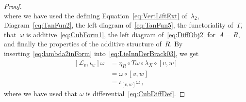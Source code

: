 \documentclass[12pt,reqno, a4paper]{amsart}
\numberwithin{equation}{section}
\theoremstyle{plain}
\theoremstyle{definition}
\theoremstyle{remark}
\newcommand{\Lie}{\mathcal{L}}
\newcommand{\Val}{\eta}
\begin{document}
\begin{proof}
\begin{equation}
\end{equation}
where we have used the defining Equation~\eqref{eq:VertLiftExt} of~$\lambda_2$, Diagram~\eqref{eq:TanFun2}, the left diagram of~\eqref{eq:TanFun5}, the functoriality of~$T$, that~$\omega$ is additive~\eqref{eq:CubForm1}, the left diagram of~\eqref{eq:DiffObj2} for~$A=R$, and finally the properties of the additive structure of~$R$. By inserting~\eqref{eq:lambda2inForm} into~\eqref{eq:LieInnDerBrack03}, we get
\begin{equation*}
\begin{split}
  [\Lie_v, \iota_w]\omega
  &=
    \Val_R \circ T\omega \circ \lambda_X \circ [v,w]
  \\
  &=
    \omega \circ [v,w]
  \\
  &=
  \iota_{[v,w]} \omega
  \,,
\end{split}
\end{equation*}
where we have used that $\omega$ is differential~\eqref{eq:CubDiffDef}.


\end{proof}
\end{document}
